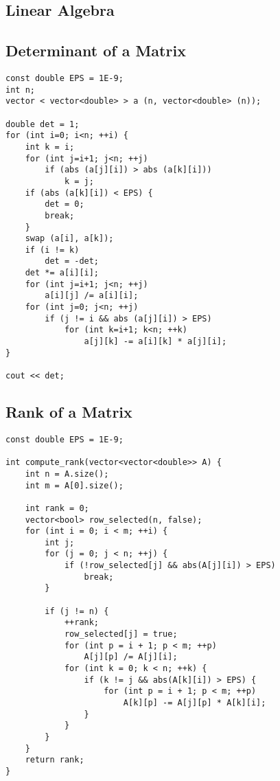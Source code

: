 \documentclass[10pt]{article}
\begin{document}
\begin{multicols*}{2}
\section{Linear Algebra}

\subsection{Determinant of a Matrix}

\begin{lstlisting}[style=compactcpp]
const double EPS = 1E-9;
int n;
vector < vector<double> > a (n, vector<double> (n));

double det = 1;
for (int i=0; i<n; ++i) {
    int k = i;
    for (int j=i+1; j<n; ++j)
        if (abs (a[j][i]) > abs (a[k][i]))
            k = j;
    if (abs (a[k][i]) < EPS) {
        det = 0;
        break;
    }
    swap (a[i], a[k]);
    if (i != k)
        det = -det;
    det *= a[i][i];
    for (int j=i+1; j<n; ++j)
        a[i][j] /= a[i][i];
    for (int j=0; j<n; ++j)
        if (j != i && abs (a[j][i]) > EPS)
            for (int k=i+1; k<n; ++k)
                a[j][k] -= a[i][k] * a[j][i];
}

cout << det;
\end{lstlisting}

\subsection{Rank of a Matrix}
\begin{lstlisting}[style=compactcpp]
const double EPS = 1E-9;

int compute_rank(vector<vector<double>> A) {
    int n = A.size();
    int m = A[0].size();

    int rank = 0;
    vector<bool> row_selected(n, false);
    for (int i = 0; i < m; ++i) {
        int j;
        for (j = 0; j < n; ++j) {
            if (!row_selected[j] && abs(A[j][i]) > EPS)
                break;
        }

        if (j != n) {
            ++rank;
            row_selected[j] = true;
            for (int p = i + 1; p < m; ++p)
                A[j][p] /= A[j][i];
            for (int k = 0; k < n; ++k) {
                if (k != j && abs(A[k][i]) > EPS) {
                    for (int p = i + 1; p < m; ++p)
                        A[k][p] -= A[j][p] * A[k][i];
                }
            }
        }
    }
    return rank;
}

\end{lstlisting}



\end{multicols*}
\end{document}
